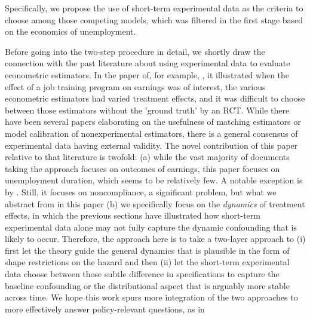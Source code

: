 \documentclass{article}
\begin{document}
             Specifically, we propose the use of short-term experimental data as the criteria to choose among those competing models, which was filtered in the first stage based on the economics of unemployment.
             
             Before going into the two-step procedure in detail, we shortly draw the connection with the past literature about using experimental data to evaluate econometric estimators. In the paper of, for example, \cite{lalonde1986evaluating}, it illustrated when the effect of a job training program on earnings was of interest, the various econometric estimators had varied treatment effects, and it was difficult to choose between those estimators without the 'ground truth' by an RCT. While there have been several papers elaborating on the usefulness of matching estimators or model calibration \cite{heckman1997matching,heckman1998characterizing} of nonexperimental estimators, there is a general consensus of experimental data having external validity.
             The novel contribution of this paper relative to that literature is twofold: (a) while the vast majority of documents taking the \cite{lalonde 1986} approach focuses on outcomes of earnings, this paper focuses on unemployment duration, which seems to be relatively few. A notable exception is by \cite{ham1996effect}. Still, it focuses on noncompliance, a significant problem, but what we abstract from in this paper (b) we specifically focus on the \textit{dynamics  }of treatment effects, in which the previous sections have illustrated how short-term experimental data alone may not fully capture the dynamic confounding that is likely to occur. Therefore, the approach here is to take a two-layer approach to (i) first let the theory guide the general dynamics that is plausible in the form of shape restrictions on the hazard and then (ii) let the short-term experimental data choose between those subtle difference in specifications to capture the baseline confounding or the distributional aspect that is arguably more stable across time. We hope this work spurs more integration of the two approaches to more effectively answer policy-relevant questions, as in \cite{todd2020best}
             
\end{document}
